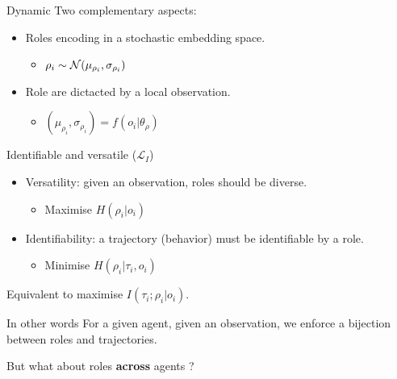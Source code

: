 \documentclass{beamer}
\begin{document}
    \begin{frame}{Dynamic}
        Two complementary aspects:

        \begin{itemize}
            \item Roles encoding in a stochastic embedding space.
            \begin{itemize}
                \item $\rho_i \sim \mathcal{N}(\mu_{\rho_i},\sigma_{\rho_i})$
            \end{itemize}
            \item Role are dictacted by a local observation.
            \begin{itemize}
                \item $(\mu_{\rho_i},\sigma_{\rho_i}) = f(o_i|\theta_{\rho})$
            \end{itemize}
        \end{itemize}

    \end{frame}

    \begin{frame}{Identifiable and versatile ($\mathcal{L}_{I}$)}

        \begin{itemize}
            \item Versatility: given an observation, roles should be diverse.
            \begin{itemize}
                \item Maximise $H(\rho_i|o_i)$
            \end{itemize}
            \item Identifiability: a trajectory (behavior) must be identifiable by a role.
            \begin{itemize}
                \item Minimise $H(\rho_i|\tau_i, o_i)$
            \end{itemize}
        \end{itemize}

        \begin{block}{}
            Equivalent to maximise $I(\tau_i;\rho_i|o_i)$.
        \end{block}
        \begin{block}{In other words}
            For a given agent, given an observation, we enforce a bijection between roles and trajectories.
        \end{block}


        \begin{alertblock}{}
            But what about roles \textbf{across} agents ?
        \end{alertblock}

    \end{frame}
\end{document}
